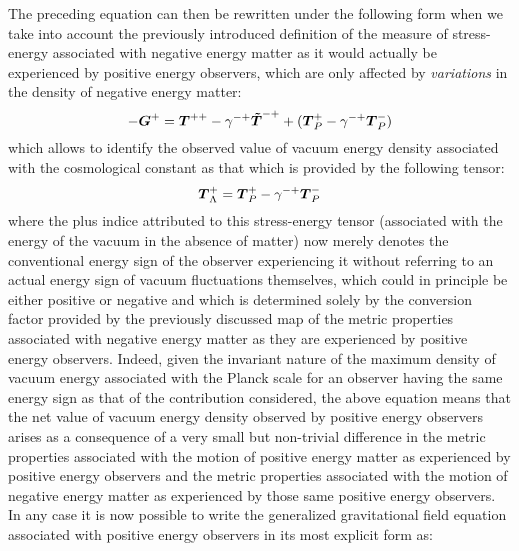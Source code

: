 \documentclass[notitlepage,12pt]{report}
\newcommand{\bm}[1]{\mbox{\boldmath $#1$}}
\begin{document}
The preceding equation can then be rewritten under the following form when we take into account the previously introduced definition of the measure of stress-energy associated with negative energy matter as it would actually be experienced by positive energy observers, which are only affected by \textit{variations} in the density of negative energy matter:
\begin{equation}\label{eq:2.13}
-\bm{G}^+=\bm{T}^{++}-\gamma^{-+}\bm{\tilde{T}}^{-+}+(\bm{T}_P^{+}-\gamma^{-+}\bm{T}_P^{-})
\end{equation}
which allows to identify the observed value of vacuum energy density associated with the cosmological constant as that which is provided by the following tensor:
\begin{equation}\label{eq:2.14}
\bm{T}_{\Lambda}^+=\bm{T}_P^{+}-\gamma^{-+}\bm{T}_P^{-}
\end{equation}
where the plus indice attributed to this stress-energy tensor (associated with the energy of the vacuum in the absence of matter) now merely denotes the conventional energy sign of the observer experiencing it without referring to an actual energy sign of vacuum fluctuations themselves, which could in principle be either positive or negative and which is determined solely by the conversion factor provided by the previously discussed map of the metric properties associated with negative energy matter as they are experienced by positive energy observers. Indeed, given the invariant nature of the maximum density of vacuum energy associated with the Planck scale for an observer having the same energy sign as that of the contribution considered, the above equation means that the net value of vacuum energy density observed by positive energy observers arises as a consequence of a very small but non-trivial difference in the metric properties associated with the motion of positive energy matter as experienced by positive energy observers and the metric properties associated with the motion of negative energy matter as experienced by those same positive energy observers. In any case it is now possible to write the generalized gravitational field equation associated with positive energy observers in its most explicit form as:
\end{document}

